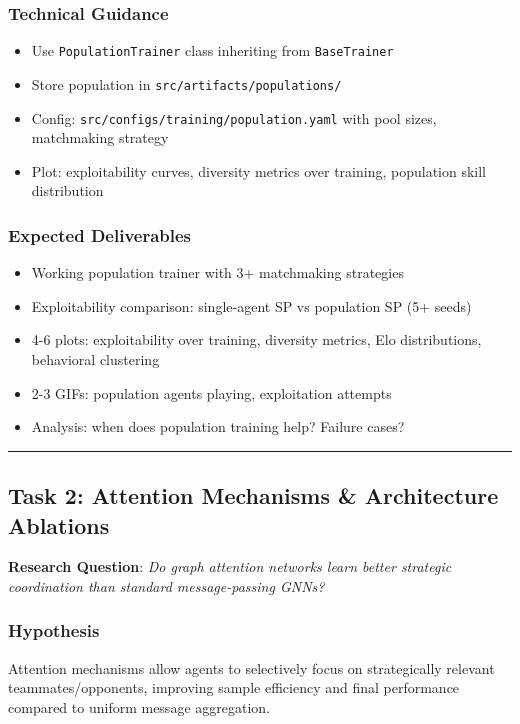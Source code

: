 \documentclass[11pt,a4paper]{scrartcl}
\newcommand{\codepath}[1]{\colorbox{codehighlight}{\texttt{#1}}}
\newcommand{\sectiondivider}{%
  \vspace{0.2em}%
  \noindent\textcolor{rulecolor}{\rule{0.3\textwidth}{0.4pt}}%
  \vspace{0.3em}%
}
\begin{document}
\subsubsection*{Technical Guidance}
\begin{itemize}[leftmargin=1.2em]
    \item Use \texttt{PopulationTrainer} class inheriting from \texttt{BaseTrainer}
    \item Store population in \codepath{src/artifacts/populations/}
    \item Config: \codepath{src/configs/training/population.yaml} with pool sizes, matchmaking strategy
    \item Plot: exploitability curves, diversity metrics over training, population skill distribution
\end{itemize}

\subsubsection*{Expected Deliverables}
\begin{itemize}[leftmargin=1.2em]
    \item Working population trainer with 3+ matchmaking strategies
    \item Exploitability comparison: single-agent SP vs population SP (5+ seeds)
    \item 4-6 plots: exploitability over training, diversity metrics, Elo distributions, behavioral clustering
    \item 2-3 GIFs: population agents playing, exploitation attempts
    \item Analysis: when does population training help? Failure cases?
\end{itemize}

\sectiondivider

\subsection*{Task 2: Attention Mechanisms \& Architecture Ablations}
\textbf{Research Question}: \textit{Do graph attention networks learn better strategic coordination than standard message-passing GNNs?}

\subsubsection*{Hypothesis}
Attention mechanisms allow agents to selectively focus on strategically relevant teammates/opponents, improving sample efficiency and final performance compared to uniform message aggregation.
\end{document}
